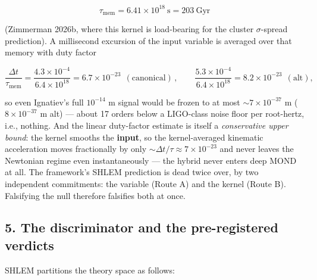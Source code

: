 \documentclass[
]{article}
\begin{document}
\[\tau_\mathrm{mem} = 6.41\times10^{18}\ \mathrm{s} = 203\ \mathrm{Gyr}\]

(Zimmerman 2026b, where this kernel is load-bearing for the cluster
\(\sigma\)-spread prediction). A millisecond excursion of the input
variable is averaged over that memory with duty factor

\[\frac{\Delta t}{\tau_\mathrm{mem}} = \frac{4.3\times10^{-4}}{6.4\times10^{18}} = 6.7\times10^{-23}\ \ (\text{canonical})\,, \qquad \frac{5.3\times10^{-4}}{6.4\times10^{18}} = 8.2\times10^{-23}\ \ (\text{alt}),\]

so even Ignatiev's full \(10^{-14}\) m signal would be frozen to at most
\(\sim 7\times10^{-37}\) m (\(8\times10^{-37}\) m alt) --- about 17
orders below a LIGO-class noise floor per root-hertz, i.e., nothing. And
the linear duty-factor estimate is itself a \emph{conservative upper
bound}: the kernel smooths the \textbf{input}, so the kernel-averaged
kinematic acceleration moves fractionally by only
\(\sim\Delta t/\tau \approx 7\times10^{-23}\) and never leaves the
Newtonian regime even instantaneously --- the hybrid never enters deep
MOND at all. The framework's SHLEM prediction is dead twice over, by two
independent commitments: the variable (Route A) and the kernel (Route
B). Falsifying the null therefore falsifies both at once.

\subsection{5. The discriminator and the pre-registered
verdicts}\label{the-discriminator-and-the-pre-registered-verdicts}

SHLEM partitions the theory space as follows:
\end{document}
